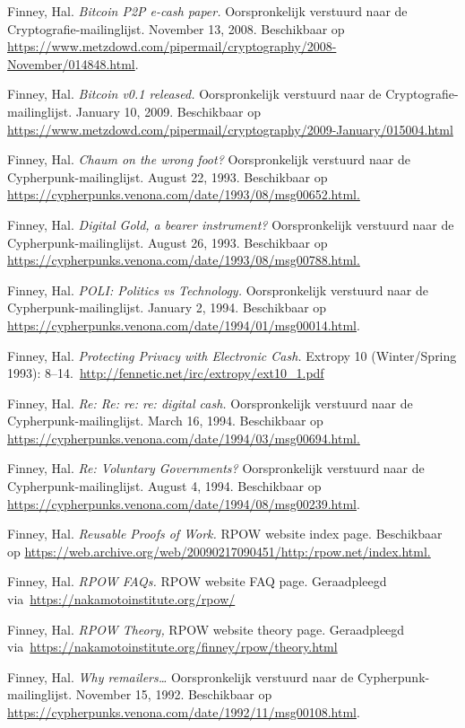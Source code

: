 \documentclass[
  a5paper,
  smalldemyvopaper,11pt,twoside,onecolumn,openright,extrafontsizes,
hidelinks]{memoir}
\begin{document}
{Finney, Hal. \emph{Bitcoin P2P e-cash paper.} Oorspronkelijk verstuurd
naar de Cryptografie-mailinglijst. November 13, 2008. Beschikbaar op
\url{https://www.metzdowd.com/pipermail/cryptography/2008-November/014848.html}.

Finney, Hal. \emph{Bitcoin v0.1 released.} Oorspronkelijk verstuurd naar
de Cryptografie-mailinglijst. January 10, 2009. Beschikbaar op
\url{https://www.metzdowd.com/pipermail/cryptography/2009-January/015004.html}

Finney, Hal. \emph{Chaum on the wrong foot?} Oorspronkelijk verstuurd
naar de Cypherpunk-mailinglijst. August 22, 1993. Beschikbaar op
\url{https://cypherpunks.venona.com/date/1993/08/msg00652.html.}

Finney, Hal. \emph{Digital Gold, a bearer instrument?} Oorspronkelijk
verstuurd naar de Cypherpunk-mailinglijst. August 26, 1993. Beschikbaar
op \url{https://cypherpunks.venona.com/date/1993/08/msg00788.html.}

Finney, Hal. \emph{POLI: Politics vs Technology.} Oorspronkelijk
verstuurd naar de Cypherpunk-mailinglijst. January 2, 1994. Beschikbaar
op \url{https://cypherpunks.venona.com/date/1994/01/msg00014.html}.

Finney, Hal. \emph{Protecting Privacy with Electronic Cash.} Extropy 10
(Winter/Spring 1993):
8--14.~\url{http://fennetic.net/irc/extropy/ext10_1.pdf}

Finney, Hal. \emph{Re: Re: re: re: digital cash.} Oorspronkelijk
verstuurd naar de Cypherpunk-mailinglijst. March 16, 1994. Beschikbaar
op \url{https://cypherpunks.venona.com/date/1994/03/msg00694.html.}

Finney, Hal. \emph{Re: Voluntary Governments?} Oorspronkelijk verstuurd
naar de Cypherpunk-mailinglijst. August 4, 1994. Beschikbaar op
\url{https://cypherpunks.venona.com/date/1994/08/msg00239.html}.

Finney, Hal. \emph{Reusable Proofs of Work.} RPOW website index page.
Beschikbaar op
\url{https://web.archive.org/web/20090217090451/http:/rpow.net/index.html.}

Finney, Hal. \emph{RPOW FAQs.} RPOW website FAQ page. Geraadpleegd
via~\url{https://nakamotoinstitute.org/rpow/}

Finney, Hal. \emph{RPOW Theory,} RPOW website theory page. Geraadpleegd
via~\url{https://nakamotoinstitute.org/finney/rpow/theory.html}

Finney, Hal. \emph{Why remailers\ldots{}} Oorspronkelijk verstuurd naar
de Cypherpunk-mailinglijst. November 15, 1992. Beschikbaar op
\url{https://cypherpunks.venona.com/date/1992/11/msg00108.html}.

}
\end{document}
